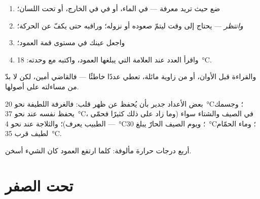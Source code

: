 \begin{method}\label{met:g3:temperature-thermometers:read}
\begin{enumerate}
  \item ضع  حيث تريد معرفة  --- في
        الماء، أو في  في الخارج، أو تحت اللسان؛
  \item \emph{وانتظر} ---  يحتاج إلى وقت ليتمّ صعوده أو
        نزوله؛ وراقبه حتى يكفّ عن الحركة؛
  \item واجعل عينك في مستوى قمة العمود؛
  \item واقرأ العدد عند العلامة التي يبلغها العمود، واكتبه مع
        وحدته: \qty{18}{\celsius}.
\end{enumerate}
والقراءة قبل الأوان، أو من زاوية مائلة، تعطي عددًا خاطئًا ---
فالقاضي أمين، لكن لا بدّ من مساءلته على أصولها.
\end{method}

\begin{example}\label{ex:g3:temperature-thermometers:livedby}
بعض الأعداد جدير بأن يُحفظ عن ظهر قلب: فالغرفة اللطيفة نحو
\qty{20}{\celsius}؛ وجسمك يحفظ نفسه عند نحو \qty{37}{\celsius}،
في الصيف والشتاء سواء (وما زاد على ذلك كثيرًا فحمّى ---  الطبيب يعرف)؛ والثلاجة عند نحو \qty{4}{\celsius}؛ ويوم
الصيف الحارّ يبلغ \qty{30}{\celsius}؛ وماء الحمّام لطيف قرب
\qty{35}{\celsius}.
\end{example}

\begin{omfigure}

{\small أربع درجات حرارة مألوفة: كلما ارتفع العمود كان الشيء
أسخن.}
\end{omfigure}

\section{تحت الصفر}

